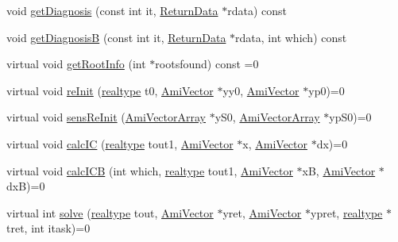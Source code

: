 \begin{DoxyCompactItemize}
\item 
void \mbox{\hyperlink{classamici_1_1_solver_a07318808fed3463ea8de7f25e3698343}{get\+Diagnosis}} (const int it, \mbox{\hyperlink{classamici_1_1_return_data}{Return\+Data}} $\ast$rdata) const
\item 
void \mbox{\hyperlink{classamici_1_1_solver_aa7aec3090326db73739483e141e65cda}{get\+DiagnosisB}} (const int it, \mbox{\hyperlink{classamici_1_1_return_data}{Return\+Data}} $\ast$rdata, int which) const
\item 
virtual void \mbox{\hyperlink{classamici_1_1_solver_acab2ddcee3d62bef9f3e186aee8898e9}{get\+Root\+Info}} (int $\ast$rootsfound) const =0
\item 
virtual void \mbox{\hyperlink{classamici_1_1_solver_acfcd1423675ef1abc302f3ac50353932}{re\+Init}} (\mbox{\hyperlink{namespaceamici_a1bdce28051d6a53868f7ccbf5f2c14a3}{realtype}} t0, \mbox{\hyperlink{classamici_1_1_ami_vector}{Ami\+Vector}} $\ast$yy0, \mbox{\hyperlink{classamici_1_1_ami_vector}{Ami\+Vector}} $\ast$yp0)=0
\item 
virtual void \mbox{\hyperlink{classamici_1_1_solver_a5a982db994b0ee9127a2f688e3b38911}{sens\+Re\+Init}} (\mbox{\hyperlink{classamici_1_1_ami_vector_array}{Ami\+Vector\+Array}} $\ast$y\+S0, \mbox{\hyperlink{classamici_1_1_ami_vector_array}{Ami\+Vector\+Array}} $\ast$yp\+S0)=0
\item 
virtual void \mbox{\hyperlink{classamici_1_1_solver_ac3a257a7b79cc6d69a980a0148873ccc}{calc\+IC}} (\mbox{\hyperlink{namespaceamici_a1bdce28051d6a53868f7ccbf5f2c14a3}{realtype}} tout1, \mbox{\hyperlink{classamici_1_1_ami_vector}{Ami\+Vector}} $\ast$x, \mbox{\hyperlink{classamici_1_1_ami_vector}{Ami\+Vector}} $\ast$dx)=0
\item 
virtual void \mbox{\hyperlink{classamici_1_1_solver_a2c1d163bbfb33e9f9c93cda583ad6537}{calc\+I\+CB}} (int which, \mbox{\hyperlink{namespaceamici_a1bdce28051d6a53868f7ccbf5f2c14a3}{realtype}} tout1, \mbox{\hyperlink{classamici_1_1_ami_vector}{Ami\+Vector}} $\ast$xB, \mbox{\hyperlink{classamici_1_1_ami_vector}{Ami\+Vector}} $\ast$dxB)=0
\item 
virtual int \mbox{\hyperlink{classamici_1_1_solver_a977280dc1ce01449f530a2ebc31e5dea}{solve}} (\mbox{\hyperlink{namespaceamici_a1bdce28051d6a53868f7ccbf5f2c14a3}{realtype}} tout, \mbox{\hyperlink{classamici_1_1_ami_vector}{Ami\+Vector}} $\ast$yret, \mbox{\hyperlink{classamici_1_1_ami_vector}{Ami\+Vector}} $\ast$ypret, \mbox{\hyperlink{namespaceamici_a1bdce28051d6a53868f7ccbf5f2c14a3}{realtype}} $\ast$tret, int itask)=0
\item 

\end{DoxyCompactItemize}
